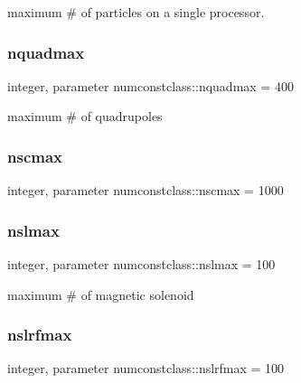 maximum \# of particles on a single processor. 

\mbox{\label{namespacenumconstclass_a93ef59ed830442249dee14d677ddeb08}} 
\subsubsection{\texorpdfstring{nquadmax}{nquadmax}}
{\footnotesize\ttfamily integer, parameter numconstclass\+::nquadmax = 400}



maximum \# of quadrupoles 

\mbox{\label{namespacenumconstclass_a842fc257d326a7d9ec49e681832e6aa3}} 
\subsubsection{\texorpdfstring{nscmax}{nscmax}}
{\footnotesize\ttfamily integer, parameter numconstclass\+::nscmax = 1000}

\mbox{\label{namespacenumconstclass_a538bae3eec1dd1a5815019847df66e23}} 
\subsubsection{\texorpdfstring{nslmax}{nslmax}}
{\footnotesize\ttfamily integer, parameter numconstclass\+::nslmax = 100}



maximum \# of magnetic solenoid 

\mbox{\label{namespacenumconstclass_a454ee9bf5d3755b8cfc222eedcb9495d}} 
\subsubsection{\texorpdfstring{nslrfmax}{nslrfmax}}
{\footnotesize\ttfamily integer, parameter numconstclass\+::nslrfmax = 100}



